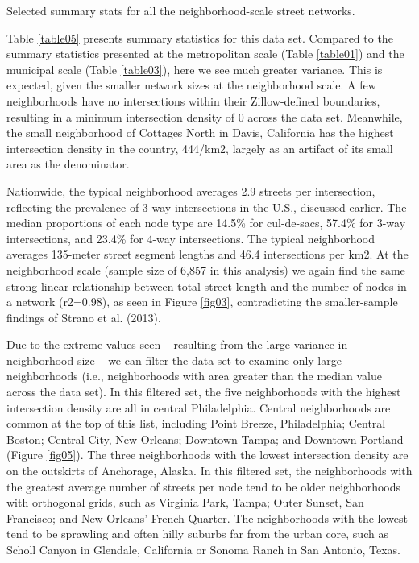 \documentclass[Afour,sageh,times]{sage/sagej}
\begin{document}
\begin{table}
\caption{Selected summary stats for all the neighborhood-scale street networks.}
\label{table05}
\end{table}

Table \ref{table05} presents summary statistics for this data set. Compared to the summary statistics presented at the metropolitan scale (Table \ref{table01}) and the municipal scale (Table \ref{table03}), here we see much greater variance. This is expected, given the smaller network sizes at the neighborhood scale. A few neighborhoods have no intersections within their Zillow-defined boundaries, resulting in a minimum intersection density of 0 across the data set. Meanwhile, the small neighborhood of Cottages North in Davis, California has the highest intersection density in the country, 444/km2, largely as an artifact of its small area as the denominator. 

Nationwide, the typical neighborhood averages 2.9 streets per intersection, reflecting the prevalence of 3-way intersections in the U.S., discussed earlier. The median proportions of each node type are 14.5\% for cul-de-sacs, 57.4\% for 3-way intersections, and 23.4\% for 4-way intersections. The typical neighborhood averages 135-meter street segment lengths and 46.4 intersections per km2. At the neighborhood scale (sample size of 6,857 in this analysis) we again find the same strong linear relationship between total street length and the number of nodes in a network (r2=0.98), as seen in Figure \ref{fig03}, contradicting the smaller-sample findings of Strano et al. (2013).

Due to the extreme values seen – resulting from the large variance in neighborhood size – we can filter the data set to examine only large neighborhoods (i.e., neighborhoods with area greater than the median value across the data set). In this filtered set, the five neighborhoods with the highest intersection density are all in central Philadelphia. Central neighborhoods are common at the top of this list, including Point Breeze, Philadelphia; Central Boston; Central City, New Orleans; Downtown Tampa; and Downtown Portland (Figure \ref{fig05}). The three neighborhoods with the lowest intersection density are on the outskirts of Anchorage, Alaska. In this filtered set, the neighborhoods with the greatest average number of streets per node tend to be older neighborhoods with orthogonal grids, such as Virginia Park, Tampa; Outer Sunset, San Francisco; and New Orleans' French Quarter. The neighborhoods with the lowest tend to be sprawling and often hilly suburbs far from the urban core, such as Scholl Canyon in Glendale, California or Sonoma Ranch in San Antonio, Texas.
\end{document}
